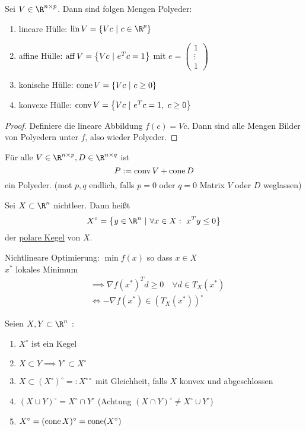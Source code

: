 \begin{lemma}
	Sei $V \in \R^{n \times p}$. Dann sind folgen Mengen Polyeder:
	\begin{enumerate}[label = (\alph*)]
		\item lineare Hülle: $\lin V = \left\{ Vc\ |\ c \in \R^p \right\}$ 
		\item affine Hülle: $\aff V = \left\{ Vc\ |\ e^{T} c =1 \right\}$ mit $e  = 
				\begin{pmatrix}
					1 \\
					\vdots \\ 
					1
				\end{pmatrix}$
		\item konische Hülle: $\cone V = \left\{ Vc\ |\ c \geq 0 \right\}$ 
		\item konvexe Hülle: $\conv V = \left\{ Vc\ |\ e^{T} c =1,\ c \geq 0  \right\}$ 
	\end{enumerate}
\end{lemma}
\begin{proof}
	Definiere die lineare Abbildung $f(c) = Vc$.
	Dann sind alle Mengen Bilder von Polyedern unter $f$, also wieder Polyeder.
\end{proof}
\begin{korollar}
	Für alle $V \in \R^{n \times p}, D \in \R^{n\times q}$ ist 
	\begin{equation*}
		P := \operatorname{conv} V + \operatorname{cone} D
	\end{equation*}
	ein Polyeder. (mot $p,q$ endlich, falls $p=0$ oder $q=0$ Matrix $V$ oder $D$ weglassen)
\end{korollar}
\begin{definition}
	Sei $X \subset \R^n$ nichtleer. Dann heißt
	\begin{equation*}
		X^\circ= \left\{ y \in \R^n\ |\ \forall x \in X:\ x^{T} y \leq 0 \right\}
	\end{equation*}
	der \underline{polare Kegel} von $X$.
\end{definition}
Nichtlineare Optimierung: $\min f(x)$ so dass $x\in X$ \\
$x^*$ lokales Minimum 
\begin{align*}
	&\implies \nabla f(x^*)^{T} d \geq 0 \quad \forall d \in T_{X}(x^*)\\
	&\iff - \nabla f(x^*) \in \left( T_{X}(x^*) \right)^\circ
\end{align*}
\begin{lemma}
	Seien $X,Y \subset \R^n$ :
	\begin{enumerate}[label = (\alph*)]
		\item $X^\circ$ ist ein Kegel
		\item $X \subset Y \implies Y^\circ \subset X^\circ$
		\item $X \subset  \left( X^\circ \right)^\circ=: X^{\circ\circ}$ mit Gleichheit, falls $X$ konvex und abgeschlossen
		\item $\left( X \cup Y \right)^\circ = X^\circ \cap Y^\circ$ (Achtung $\left( X \cap Y \right)^\circ \neq X^\circ\cup Y^\circ$)
		\item $X^\circ = (\operatorname{cone} X)^\circ = \operatorname{cone}(X^\circ)$
	\end{enumerate}
\end{lemma}
